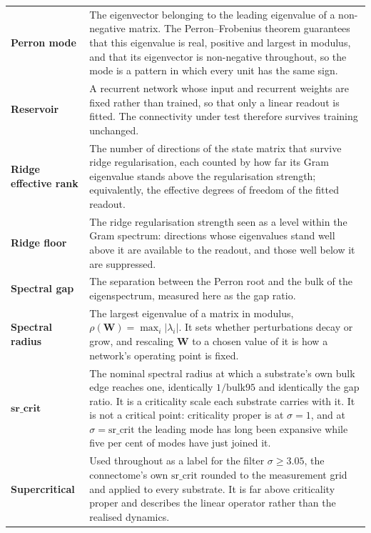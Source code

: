 \begin{longtable}{>{\raggedright\arraybackslash}p{3.4cm}p{\dimexpr\linewidth-3.4cm-4\tabcolsep\relax}}
    \textbf{Perron mode} & The eigenvector belonging to the leading eigenvalue of a non-negative matrix. The Perron--Frobenius theorem guarantees that this eigenvalue is real, positive and largest in modulus, and that its eigenvector is non-negative throughout, so the mode is a pattern in which every unit has the same sign. \\

    \textbf{Reservoir} & A recurrent network whose input and recurrent weights are fixed rather than trained, so that only a linear readout is fitted. The connectivity under test therefore survives training unchanged. \\

    \textbf{Ridge effective rank} & The number of directions of the state matrix that survive ridge regularisation, each counted by how far its Gram eigenvalue stands above the regularisation strength; equivalently, the effective degrees of freedom of the fitted readout. \\

    \textbf{Ridge floor} & The ridge regularisation strength seen as a level within the Gram spectrum: directions whose eigenvalues stand well above it are available to the readout, and those well below it are suppressed. \\

    \textbf{Spectral gap} & The separation between the Perron root and the bulk of the eigenspectrum, measured here as the gap ratio. \\

    \textbf{Spectral radius} & The largest eigenvalue of a matrix in modulus, $\rho(\mathbf{W}) = \operatorname{max}_i|\lambda_i|$. It sets whether perturbations decay or grow, and rescaling $\mathbf{W}$ to a chosen value of it is how a network's operating point is fixed. \\

    $\mathrm{\textbf{sr\_crit}}$ & The nominal spectral radius at which a substrate's own bulk edge reaches one, identically $1/\mathrm{bulk95}$ and identically the gap ratio. It is a criticality scale each substrate carries with it. It is not a critical point: criticality proper is at $\sigma = 1$, and at $\sigma = \mathrm{sr\_crit}$ the leading mode has long been expansive while five per cent of modes have just joined it. \\

    \textbf{Supercritical} & Used throughout as a label for the filter $\sigma \geq 3.05$, the connectome's own $\mathrm{sr\_crit}$ rounded to the measurement grid and applied to every substrate. It is far above criticality proper and describes the linear operator rather than the realised dynamics. \\


\end{longtable}
